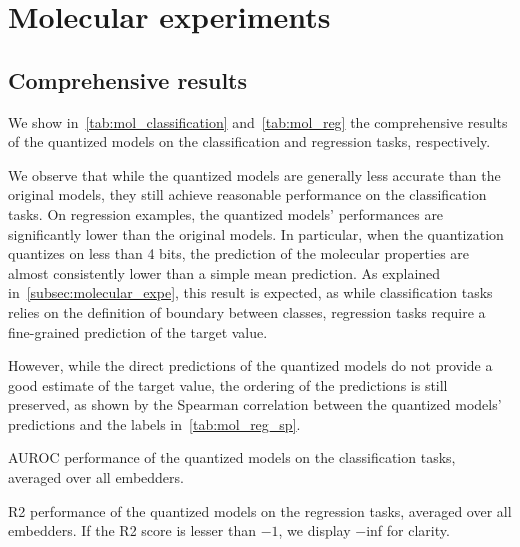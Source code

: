 \section{Molecular experiments}
\label{app:molecular_details}

\subsection{Comprehensive results}
\label{subsec:comp_results}

We show in~\autoref{tab:mol_classification} and~\autoref{tab:mol_reg} the comprehensive results of the quantized models on the classification and regression tasks, respectively.

We observe that while the quantized models are generally less accurate than the original models, they still achieve reasonable performance on the classification tasks.
On regression examples, the quantized models' performances are significantly lower than the original models.
In particular, when the quantization quantizes on less than 4 bits, the prediction of the molecular properties are almost consistently lower than a simple mean prediction.
As explained in~\autoref{subsec:molecular_expe}, this result is expected, as while classification tasks relies on the definition of boundary between classes, regression tasks require a fine-grained prediction of the target value.

However, while the direct predictions of the quantized models do not provide a good estimate of the target value, the ordering of the predictions is still preserved, as shown by the Spearman correlation between the quantized models' predictions and the labels in~\autoref{tab:mol_reg_sp}.


\begin{table*}
    \caption{
        AUROC performance of the quantized models on the classification tasks, averaged over all embedders.
    }
    \label{tab:mol_classification}
    \resizebox{\textwidth}{!}{
        
    }
\end{table*}

\begin{table*}
    \caption{
        R2 performance of the quantized models on the regression tasks, averaged over all embedders. If the R2 score is lesser than $-1$, we display $-$inf for clarity.
    }
    \label{tab:mol_reg}
\resizebox{\textwidth}{!}{
        
    }
\end{table*}


